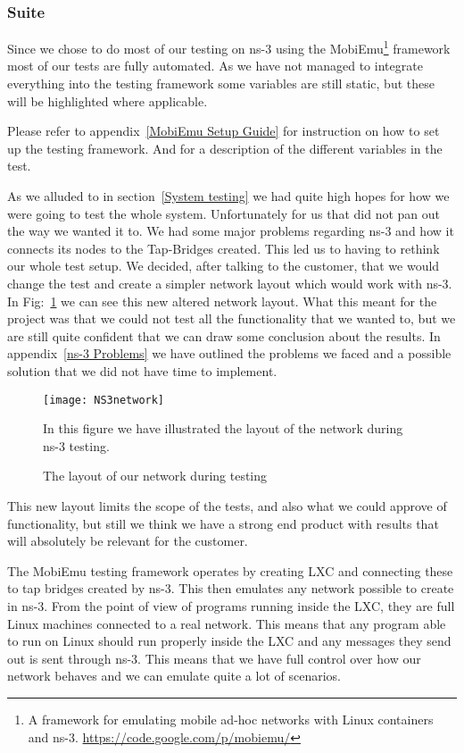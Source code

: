 \subsubsection{Suite}\label{Testing:About:Suite}
	Since we chose to do most of our testing on ns-3 using the MobiEmu\footnote{A framework for emulating mobile ad-hoc networks with Linux containers and ns-3. \url{https://code.google.com/p/mobiemu/}} framework most of our tests are fully automated. As we have not managed to integrate everything into the testing framework some variables are still static, but these will be highlighted where applicable.

	\begin{shaded}
	Please refer to appendix~\ref{MobiEmu Setup Guide} for instruction on how to set up the testing framework. And for a description of the different variables in the test.
	\end{shaded}
	
	As we alluded to in section~\ref{System testing} we had quite high hopes for how we were going to test the whole system. Unfortunately for us that did not pan out the way we wanted it to. We had some major problems regarding ns-3 and how it connects its nodes to the Tap-Bridges created. This led us to having to rethink our whole test setup. We decided, after talking to the customer, that we would change the test and create a simpler network layout which would work with ns-3. In Fig:~\ref{fig:ns-3network} we can see this new altered network layout. What this meant for the project was that we could not test all the functionality that we wanted to, but we are still quite confident that we can draw some conclusion about the results. In appendix~\ref{ns-3 Problems} we have outlined the problems we faced and a possible solution that we did not have time to implement.
	
	\begin{figure}[H]
        \centering
        \texttt{[image: NS3network]}
        \caption{The layout of our network during testing}
        In this figure we have illustrated the layout of the network during ns-3 testing.
        \label{fig:ns-3network}
    \end{figure}
    
    This new layout limits the scope of the tests, and also what we could approve of functionality, but still we think we have a strong end product with results that will absolutely be relevant for the customer.
    
    The MobiEmu testing framework operates by creating \gls{LXC} and connecting these to tap bridges created by ns-3. This then emulates any network possible to create in ns-3. From the point of view of programs running inside the LXC, they are full Linux machines connected to a real network. This means that any program able to run on Linux should run properly inside the LXC and any messages they send out is sent through ns-3. This means that we have full control over how our network behaves and we can emulate quite a lot of scenarios.
    
